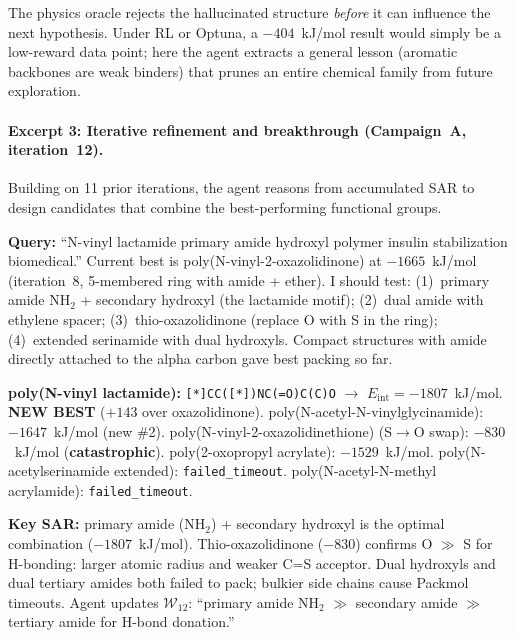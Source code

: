 \documentclass[twocolumn]{fairmeta}
\begin{document}
\noindent The physics oracle rejects the hallucinated structure \emph{before} it can influence the next hypothesis.
Under RL or Optuna, a $-404$~kJ/mol result would simply be a low-reward data point; here the agent extracts a general lesson (aromatic backbones are weak binders) that prunes an entire chemical family from future exploration.

\paragraph{Excerpt 3: Iterative refinement and breakthrough (Campaign~A, iteration~12).}
Building on 11 prior iterations, the agent reasons from accumulated SAR to design candidates that combine the best-performing functional groups.

\begin{agentthought}
\scriptsize
\textbf{Query:} ``N-vinyl lactamide primary amide hydroxyl polymer insulin stabilization biomedical.''
Current best is poly(N-vinyl-2-oxazolidinone) at $-1665$~kJ/mol (iteration~8, 5-membered ring with amide + ether).
I should test: (1)~primary amide NH$_2$ + secondary hydroxyl (the lactamide motif); (2)~dual amide with ethylene spacer; (3)~thio-oxazolidinone (replace O with S in the ring); (4)~extended serinamide with dual hydroxyls.
Compact structures with amide directly attached to the alpha carbon gave best packing so far.
\end{agentthought}

\begin{toolcall}
\scriptsize
\textbf{poly(N-vinyl lactamide):} \texttt{[*]CC([*])NC(=O)C(C)O} $\to$ $E_\text{int} = -1807$~kJ/mol. \textbf{NEW BEST} ($+143$ over oxazolidinone).
poly(N-acetyl-N-vinylglycinamide): $-1647$~kJ/mol (new \#2).
poly(N-vinyl-2-oxazolidinethione) (S$\to$O swap): $-830$~kJ/mol (\textbf{catastrophic}).
poly(2-oxopropyl acrylate): $-1529$~kJ/mol.
poly(N-acetylserinamide extended): \texttt{failed\_timeout}.
poly(N-acetyl-N-methyl acrylamide): \texttt{failed\_timeout}.
\end{toolcall}

\begin{observation}
\scriptsize
\textbf{Key SAR:} primary amide (NH$_2$) + secondary hydroxyl is the optimal combination ($-1807$~kJ/mol).
Thio-oxazolidinone ($-830$) confirms O $\gg$ S for H-bonding: larger atomic radius and weaker C=S acceptor.
Dual hydroxyls and dual tertiary amides both failed to pack; bulkier side chains cause Packmol timeouts.
Agent updates $\mathcal{W}_{12}$: ``primary amide NH$_2$ $\gg$ secondary amide $\gg$ tertiary amide for H-bond donation.''
\end{observation}
\end{document}
